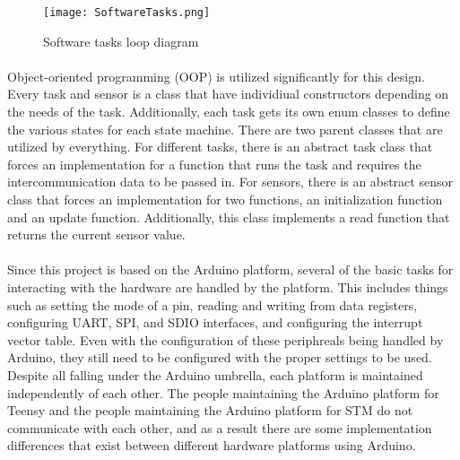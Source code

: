 \begin{figure}[H]
	\centering
	\texttt{[image: SoftwareTasks.png]}
	\caption{Software tasks loop diagram}
	\label{fig:SoftwareTasks}
\end{figure}

\paragraph{}
Object-oriented programming (OOP) is utilized significantly for this design.
Every task and sensor is a class that have individiual constructors depending on the needs of the task.
Additionally, each task gets its own enum classes to define the various states for each state machine.
There are two parent classes that are utilized by everything.
For different tasks, there is an abstract task class that forces an implementation for a function that runs the task and requires the intercommunication data to be passed in.
For sensors, there is an abstract sensor class that forces an implementation for two functions, an initialization function and an update function.
Additionally, this class implements a read function that returns the current sensor value.

\paragraph{}
Since this project is based on the Arduino platform, several of the basic tasks for interacting with the hardware are handled by the platform.
This includes things such as setting the mode of a pin, reading and writing from data registers, configuring UART, SPI, and SDIO interfaces, and configuring the interrupt vector table.
Even with the configuration of these periphreals being handled by Arduino, they still need to be configured with the proper settings to be used.
Despite all falling under the Arduino umbrella, each platform is maintained independently of each other.
The people maintaining the Arduino platform for Teensy and the people maintaining the Arduino platform for STM do not communicate with each other, and as a result there are some implementation differences that exist between different hardware platforms using Arduino.

